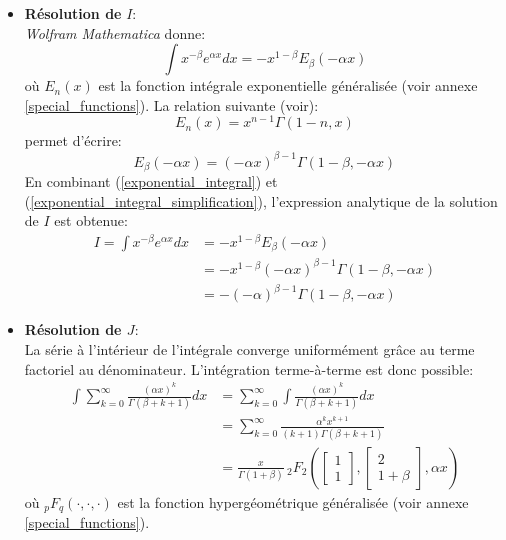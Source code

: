 \begin{itemize}
    \item \textbf{Résolution de} $I$: \\
    \textit{Wolfram Mathematica} donne:
    \begin{equation}\label{exponential_integral}
        \int x^{-\beta}e^{\alpha x}dx = -x^{1-\beta}E_\beta(-\alpha x)
    \end{equation}
    où $E_n(x)$ est la fonction intégrale exponentielle généralisée (voir annexe \ref{special_functions}).
    La relation suivante (voir\cite{abramowitz1964}):
    \[
    E_n(x)=x^{n-1}\Gamma(1-n,x)
    \]
    permet d'écrire: 
    \begin{equation}\label{exponential_integral_simplification}
        E_{\beta}(-\alpha x)={(-\alpha x)}^{\beta-1}\Gamma(1-\beta,-\alpha x)
    \end{equation}
    En combinant (\ref{exponential_integral}) et (\ref{exponential_integral_simplification}), l'expression analytique de la solution de $I$ est obtenue:
    \[
    \begin{aligned}
        I=\int x^{-\beta}e^{\alpha x}dx&=-x^{1-\beta}E_\beta(-\alpha x)\\
        &= -x^{1-\beta}{(-\alpha x)}^{\beta-1}\Gamma(1-\beta,-\alpha x)\\
        &=-{(-\alpha)}^{\beta-1}\Gamma(1-\beta,-\alpha x)
    \end{aligned}
    \]
    \item \textbf{Résolution de $J$}: \\
    La série à l'intérieur de l'intégrale converge uniformément grâce au terme factoriel au dénominateur. L'intégration terme-à-terme est donc possible: 
    \[
    \begin{aligned}
        \int\sum_{k=0}^{\infty} \frac{{(\alpha x)}^k}{\Gamma(\beta+k+1)}dx &= \sum_{k=0}^{\infty} \int \frac{{(\alpha x)}^k}{\Gamma(\beta+k+1)}dx \\
        &= \sum_{k=0}^{\infty} \frac{\alpha^k x^{k+1}}{(k+1)\Gamma(\beta+k+1)} \\
        &= \frac{x}{\Gamma(1+\beta)}\,_2F_2\left(\begin{bmatrix}1\\1\end{bmatrix},\begin{bmatrix}2\\1+\beta\end{bmatrix},\alpha x\right)
    \end{aligned}
    \]
    où $_p F_q(\cdot,\cdot,\cdot)$ est la fonction hypergéométrique généralisée (voir annexe \ref{special_functions}).
    
\end{itemize}
